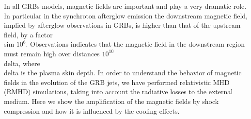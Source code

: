 


\bigskip



\bigskip

\noindent In all GRBs models, magnetic fields are important and play a very dramatic
role. In particular in the synchroton afterglow emission the downstream
magnetic field, implied by afterglow observations in GRBs, is higher than
that of the upstream field, by a factor \\sim $10^6$. Observations
indicates that the magnetic field in the downstream region must remain high
over distances $10^{10}$ \\delta, where \\delta is the plasma skin depth. In order to understand the behavior of magnetic fields in the evolution of the GRB jets, we have performed relativistic MHD (RMHD) simulations, taking into account the radiative losses to the external medium. Here we show the amplification of the magnetic fields by shock compression and how it is influenced by the cooling effects.

